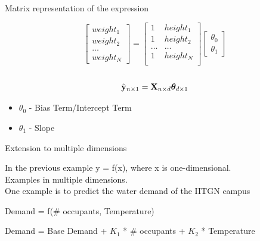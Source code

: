 \documentclass{beamer}
\begin{document}
\begin{frame}{Matrix representation of the expression}



\[\begin{bmatrix}
    weight_{1}   \\
    weight_{2}   \\
    \dots \\
    weight_{N}
\end{bmatrix}
= \begin{bmatrix}
    1& height_{1}   \\
    1& height_{2}   \\
    \dots & \dots  \\
    1& height_{N}   \\
\end{bmatrix}
\begin{bmatrix}
    \theta_{0} \\
    \theta_{1}
\end{bmatrix}\] \\

\pause \[\hat{\mathbf{y}}_{n \times 1} = \mathbf{X}_{n \times d} \boldsymbol{\theta}_{d \times 1} \]




\pause \begin{itemize}
    \item<+-> $\theta_{0}$ - Bias Term/Intercept Term
    \item<+-> $\theta_{1}$ - Slope
\end{itemize}
\end{frame}



\begin{frame}{Extension to multiple dimensions}

In the previous example y = f(x), where x is one-dimensional.\\
\pause Examples in multiple dimensions.\\
\pause One example is to predict the water demand of the IITGN campus

\small{
\begin{center}
  \pause  \begin{tcolorbox}
        Demand = f(\# occupants, Temperature)
    \end{tcolorbox}
\end{center}

\begin{center}
    \pause \begin{tcolorbox}
        Demand = Base Demand + $K_{1}$ * \# occupants + $K_{2}$ * Temperature
    \end{tcolorbox}
\end{center}
}

\end{frame}
\end{document}
